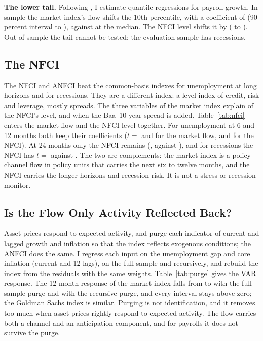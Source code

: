 \documentclass[11pt]{article}
\begin{document}


\textbf{The lower tail.} Following \citet{adrian2019}, I estimate quantile regressions for payroll growth. In sample the market index's flow shifts the 10th percentile, with a coefficient of  (90 percent interval  to ), against  at the median. The NFCI level shifts it by  ( to ). Out of sample the tail cannot be tested: the evaluation sample has  recessions.

\subsection{The NFCI}\label{sec:nfci}
The NFCI and ANFCI beat the common-basis indexes for unemployment at long horizons and for recessions. They are a different index: a level index of credit, risk and leverage, mostly spreads. The three variables of the market index explain  of the NFCI's level, and  when the Baa--10-year spread is added. Table~\ref{tab:nfci} enters the market flow and the NFCI level together. For unemployment at 6 and 12 months both keep their coefficients ($t=$  and  for the market flow,  and  for the NFCI). At 24 months only the NFCI remains (, against ), and for recessions the NFCI has $t=$  against . The two are complements: the market index is a policy-channel flow in policy units that carries the next six to twelve months, and the NFCI carries the longer horizons and recession risk. It is not a stress or recession monitor.



\subsection{Is the Flow Only Activity Reflected Back?}\label{sec:purge}
Asset prices respond to expected activity, and \citet{hatzius2010} purge each indicator of current and lagged growth and inflation so that the index reflects exogenous conditions; the ANFCI does the same. I regress each input on the unemployment gap and core inflation (current and 12 lags), on the full sample and recursively, and rebuild the index from the residuals with the same weights. Table~\ref{tab:purge} gives the VAR response. The 12-month response of the market index falls from  to  with the full-sample purge and  with the recursive purge, and every interval stays above zero; the Goldman Sachs index is similar. Purging is not identification, and it removes too much when asset prices rightly respond to expected activity. The flow carries both a channel and an anticipation component, and for payrolls it does not survive the purge.
\end{document}
